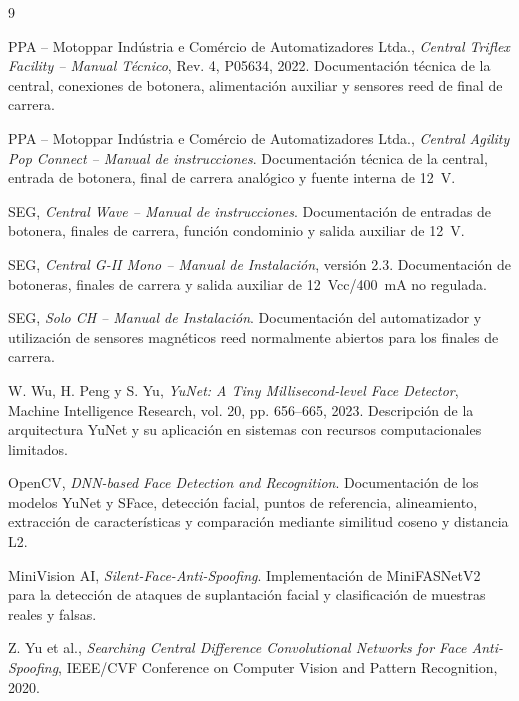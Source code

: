 \documentclass[a4paper,12pt]{report}
\begin{document}


\tableofcontents











\begin{thebibliography}{9}

 PPA -- Motoppar Indústria e Comércio de Automatizadores Ltda., \textit{Central Triflex Facility -- Manual Técnico}, Rev. 4, P05634, 2022. Documentación técnica de la central, conexiones de botonera, alimentación auxiliar y sensores reed de final de carrera.

 PPA -- Motoppar Indústria e Comércio de Automatizadores Ltda., \textit{Central Agility Pop Connect -- Manual de instrucciones}. Documentación técnica de la central, entrada de botonera, final de carrera analógico y fuente interna de 12~V.

 SEG, \textit{Central Wave -- Manual de instrucciones}. Documentación de entradas de botonera, finales de carrera, función condominio y salida auxiliar de 12~V.

 SEG, \textit{Central G-II Mono -- Manual de Instalación}, versión 2.3. Documentación de botoneras, finales de carrera y salida auxiliar de 12~Vcc/400~mA no regulada.

 SEG, \textit{Solo CH -- Manual de Instalación}. Documentación del automatizador y utilización de sensores magnéticos reed normalmente abiertos para los finales de carrera.

 W. Wu, H. Peng y S. Yu, \textit{YuNet: A Tiny Millisecond-level Face Detector}, Machine Intelligence Research, vol. 20, pp. 656--665, 2023. Descripción de la arquitectura YuNet y su aplicación en sistemas con recursos computacionales limitados.

 OpenCV, \textit{DNN-based Face Detection and Recognition}. Documentación de los modelos YuNet y SFace, detección facial, puntos de referencia, alineamiento, extracción de características y comparación mediante similitud coseno y distancia L2.

 MiniVision AI, \textit{Silent-Face-Anti-Spoofing}. Implementación de MiniFASNetV2 para la detección de ataques de suplantación facial y clasificación de muestras reales y falsas.

 Z. Yu et al., \textit{Searching Central Difference Convolutional Networks for Face Anti-Spoofing}, IEEE/CVF Conference on Computer Vision and Pattern Recognition, 2020.

\end{thebibliography}
\end{document}
